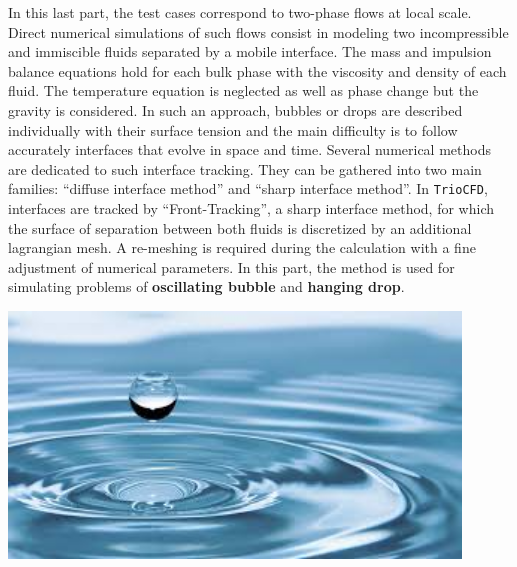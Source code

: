In this last part, the test cases correspond to two-phase flows at
local scale. Direct numerical simulations of such flows consist in
modeling two incompressible and immiscible fluids separated by a mobile
interface. The mass and impulsion balance equations hold for each
bulk phase with the viscosity and density of each fluid. The temperature
equation is neglected as well as phase change but the gravity is considered.
In such an approach, bubbles or drops are described individually with
their surface tension and the main difficulty is to follow accurately
interfaces that evolve in space and time. Several numerical methods
are dedicated to such interface tracking. They can be gathered into
two main families: ``diffuse interface method'' and ``sharp interface
method''. In \texttt{TrioCFD}, interfaces are tracked by ``Front-Tracking'',
a sharp interface method, for which the surface of separation between
both fluids is discretized by an additional lagrangian mesh. A re-meshing
is required during the calculation with a fine adjustment of numerical
parameters. In this part, the method is used for simulating problems
of \textbf{oscillating bubble} and \textbf{hanging drop}.\vspace*{3cm} \newline
\begin{center}\includegraphics[width=12cm]{tools/goutte.png}\end{center}
